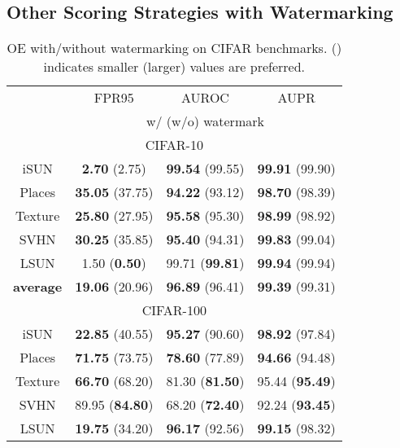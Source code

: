\documentclass{article}
\begin{document}
\subsection{Other Scoring Strategies with Watermarking}


\begin{table}[t]
\parbox{.47\linewidth}{
    \centering
\caption{OE with/without watermarking  on CIFAR benchmarks.  () indicates smaller (larger) values are preferred.} \label{tab: oe softmax}
\vspace{5pt}
\scriptsize
{
\begin{tabular}{c|ccc}
\toprule[1.5pt]
                   & FPR95      & AUROC        & AUPR       \\
                   \cline{2-4} 
\multirow{-2}{*}{} & \multicolumn{3}{c}{w/ (w/o) watermark} \\
\midrule[0.6pt]
\multicolumn{4}{c}{\cellcolor{greyL}CIFAR-10} \\
\midrule[0.6pt]
iSUN               & \textbf{2.70} (2.75) & \textbf{99.54} (99.55) & \textbf{99.91} (99.90) \\ 
Places        & \textbf{35.05} (37.75) & \textbf{94.22} (93.12) & \textbf{98.70} (98.39) \\ 
Texture            & \textbf{25.80} (27.95) & \textbf{95.58} (95.30) & \textbf{98.99} (98.92) \\ 
SVHN               & \textbf{30.25} (35.85) & \textbf{95.40} (94.31) & \textbf{99.83} (99.04) \\ 
LSUN               & {1.50} (\textbf{0.50}) & {99.71} (\textbf{99.81}) & \textbf{99.94} (99.94) \\ 
\midrule
\textbf{average}   & \textbf{19.06} (20.96) & \textbf{96.89} (96.41) & \textbf{99.39} (99.31) \\  \midrule[1pt]
\multicolumn{4}{c}{\cellcolor{greyL}CIFAR-100} \\
\midrule[1pt]
iSUN               & \textbf{22.85} (40.55) & \textbf{95.27} (90.60) & \textbf{98.92} (97.84) \\ 
Places        & \textbf{71.75} (73.75) & \textbf{78.60} (77.89) & \textbf{94.66} (94.48) \\ 
Texture            & \textbf{66.70} (68.20) & {81.30} (\textbf{81.50}) & {95.44} (\textbf{95.49}) \\ 
SVHN               & {89.95} (\textbf{84.80}) & {68.20} (\textbf{72.40}) & {92.24} (\textbf{93.45}) \\ 
LSUN               & \textbf{19.75} (34.20) & \textbf{96.17} (92.56) & \textbf{99.15} (98.32) \\ 

\end{tabular}}}
\end{table}
\end{document}
